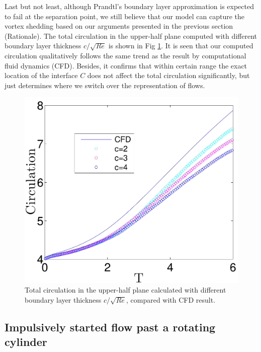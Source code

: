Last but not least, although Prandtl's boundary layer approximation is expected to fail at the separation point, we still believe that our model can capture the vortex shedding based on our arguments presented in the previous section (Rationale). 
The total circulation in the upper-half plane computed with different boundary layer thickness $c/\sqrt{Re}$ is shown in Fig \ref{fig:Circulation}.
It is seen that our computed circulation qualitatively follows the same trend as the result by computational fluid dynamics (CFD).
Besides, it confirms  that within certain range the exact location of the interface $C$ does not affect the total circulation significantly, but just determines where we switch over the representation of flows.

\begin{figure}
\begin{center}
\includegraphics[width=12cm]{./Figures/results/static/Circulation.pdf}
\end{center}
\caption[Total circulation in the upper-half plane]{Total circulation in the upper-half plane calculated with different boundary layer thickness $c/\sqrt{Re}$, compared with CFD result.}
\label{fig:Circulation}
\end{figure}


\subsection{Impulsively started flow past a rotating cylinder}


